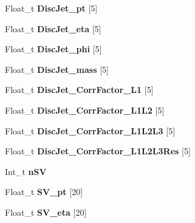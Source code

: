 \begin{DoxyCompactItemize}
\item 
\hypertarget{classMiniTree_adb228a63cef91922826d6d61a9aee08a}{}\label{classMiniTree_adb228a63cef91922826d6d61a9aee08a} 
Float\+\_\+t {\bfseries Disc\+Jet\+\_\+pt} \mbox{[}5\mbox{]}
\item 
\hypertarget{classMiniTree_a187fb74e41c8dfb3c56087cbe0e0a5b7}{}\label{classMiniTree_a187fb74e41c8dfb3c56087cbe0e0a5b7} 
Float\+\_\+t {\bfseries Disc\+Jet\+\_\+eta} \mbox{[}5\mbox{]}
\item 
\hypertarget{classMiniTree_a1eafbd2cdd781e0b92a4d2679ae9ab16}{}\label{classMiniTree_a1eafbd2cdd781e0b92a4d2679ae9ab16} 
Float\+\_\+t {\bfseries Disc\+Jet\+\_\+phi} \mbox{[}5\mbox{]}
\item 
\hypertarget{classMiniTree_a944293442ec6d6c0dc30cb86dee5d974}{}\label{classMiniTree_a944293442ec6d6c0dc30cb86dee5d974} 
Float\+\_\+t {\bfseries Disc\+Jet\+\_\+mass} \mbox{[}5\mbox{]}
\item 
\hypertarget{classMiniTree_a21865f881cfa358763d9a96c7235a22d}{}\label{classMiniTree_a21865f881cfa358763d9a96c7235a22d} 
Float\+\_\+t {\bfseries Disc\+Jet\+\_\+\+Corr\+Factor\+\_\+\+L1} \mbox{[}5\mbox{]}
\item 
\hypertarget{classMiniTree_a604dd7f373eb74244ee5e3b59fe9d3df}{}\label{classMiniTree_a604dd7f373eb74244ee5e3b59fe9d3df} 
Float\+\_\+t {\bfseries Disc\+Jet\+\_\+\+Corr\+Factor\+\_\+\+L1\+L2} \mbox{[}5\mbox{]}
\item 
\hypertarget{classMiniTree_adcc201e56c3f956a9debaa6e59e5cbc0}{}\label{classMiniTree_adcc201e56c3f956a9debaa6e59e5cbc0} 
Float\+\_\+t {\bfseries Disc\+Jet\+\_\+\+Corr\+Factor\+\_\+\+L1\+L2\+L3} \mbox{[}5\mbox{]}
\item 
\hypertarget{classMiniTree_a5024bfef4c5fcc2c7f44763a950260c9}{}\label{classMiniTree_a5024bfef4c5fcc2c7f44763a950260c9} 
Float\+\_\+t {\bfseries Disc\+Jet\+\_\+\+Corr\+Factor\+\_\+\+L1\+L2\+L3\+Res} \mbox{[}5\mbox{]}
\item 
\hypertarget{classMiniTree_aa70cae115336c763ba5e9967baf85efe}{}\label{classMiniTree_aa70cae115336c763ba5e9967baf85efe} 
Int\+\_\+t {\bfseries n\+SV}
\item 
\hypertarget{classMiniTree_a16c187b518ae9690e9148cad1f83948e}{}\label{classMiniTree_a16c187b518ae9690e9148cad1f83948e} 
Float\+\_\+t {\bfseries S\+V\+\_\+pt} \mbox{[}20\mbox{]}
\item 
\hypertarget{classMiniTree_a9125a70eadc6d55469c373f099726e1f}{}\label{classMiniTree_a9125a70eadc6d55469c373f099726e1f} 
Float\+\_\+t {\bfseries S\+V\+\_\+eta} \mbox{[}20\mbox{]}
\item 

\end{DoxyCompactItemize}
